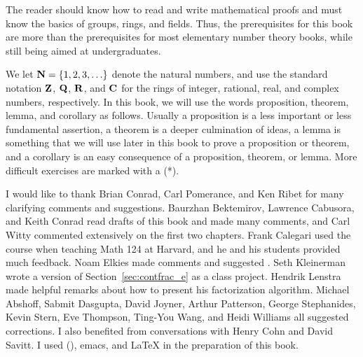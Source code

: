 \vspace{1.5ex}  The reader should know how
to read and write mathematical proofs and must know the basics of
groups, rings, and fields.  Thus, the prerequisites for this book are
more than the prerequisites for most elementary number theory books,
while still being aimed at undergraduates.

\vspace{1.5ex}  We let
$\mathbf{N}=\{1,2,3,\ldots\}$ denote the natural numbers, and use the standard
notation $\mathbf{Z}$, $\mathbf{Q}$, $\mathbf{R}$, and $\mathbf{C}$ for the rings of integer,
rational, real, and complex numbers, respectively. In
this book, we will use the words proposition, theorem, lemma, and
corollary as follows.  Usually a proposition is a less important or
less fundamental assertion, a theorem is a deeper culmination of ideas, a
lemma is something that we will use later in this book to prove a
proposition or theorem, and a corollary is an easy consequence of a
proposition, theorem, or lemma.   More difficult exercises are marked
with a (*).

\vspace{1.5ex} I would like to thank
Brian Conrad, Carl Pomerance, and Ken Ribet for many clarifying
comments and suggestions.  Baurzhan Bektemirov, Lawrence
Cabusora, and Keith Conrad read drafts of this book and made many
comments, and Carl Witty commented extensively on the first two
chapters.  Frank Calegari used the course when teaching Math 124 at
Harvard, and he and his students provided much feedback.  Noam Elkies
made comments and suggested .  Seth
Kleinerman wrote a version of Section~\ref{sec:contfrac_e} as a class
project.  Hendrik Lenstra made helpful remarks about how to present
his factorization algorithm.  Michael Abshoff, Sabmit Dasgupta, David
Joyner, Arthur Patterson, George Stephanides, Kevin Stern, Eve
Thompson, Ting-You Wang, and Heidi Williams all suggested corrections.
I also benefited from conversations with Henry Cohn and David Savitt.
I used \sage (\cite{sage}), emacs, and \LaTeX{} in the preparation of
this book.



\cleardoublepage
{}


